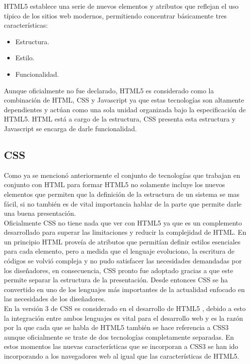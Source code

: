 HTML5 establece una serie de nuevos elementos y atributos que reflejan el uso t\'ipico de los sitios web modernos, permitiendo concentrar b\'asicamente tres caracter\'isticas:

\begin{itemize}
	\item Estructura.
	\item Estilo.
	\item Funcionalidad.
\end{itemize}

Aunque oficialmente no fue declarado, HTML5 es considerado como la combinaci\'on de HTML, CSS y Javascript ya que estas tecnolog\'ias son altamente dependientes y act\'uan como una sola unidad organizada bajo  la especificaci\'on de HTML5. HTML est\'a a cargo de la estructura, CSS presenta esta estructura y Javascript se encarga de darle funcionalidad.

\subsection{CSS}

Como ya se mencion\'o anteriormente el conjunto de tecnolog\'ias que trabajan en conjunto con HTML para formar HTML5 no solamente incluye los nuevos elementos que permiten que la definici\'on de la estructura de un sistema se mas f\'acil, si no tambi\'en es de vital importancia hablar de la parte que permite darle una buena presentaci\'on.\\

Oficialmente CSS no tiene nada que ver con HTML5 ya que es un complemento desarrollado para superar las limitaciones y reducir la complejidad de HTML. En un principio HTML prove\'ia de atributos que permit\'ian definir estilos esenciales para cada elemento, pero a medida que el lenguaje evoluciono, la escritura de c\'odigos se volvi\'o compleja  y no pudo satisfacer las necesidades demandadas por los dise\~nadores, en consecuencia, CSS pronto fue adoptado gracias a que este permite separar la estructura de la presentaci\'on. Desde entonces CSS se ha convertido en uno de los lenguajes m\'as importantes de la actualidad enfocado en las necesidades de los dise\~nadores.\\

En la versi\'on 3 de CSS es considerado en el desarrollo de HTML5 , debido a esto la integraci\'on entre ambos lenguajes es vital para el desarrollo web  y es la raz\'on por la que cada que se habla de HTML5 tambi\'en se hace referencia a CSS3 aunque oficialmente se trate de dos tecnolog\'ias completamente separadas.
En estos momentos las nuevas caracter\'isticas que se incorporan a CSS3 se han ido incorporando a los navegadores web al igual que las caracter\'isticas de HTML5.

